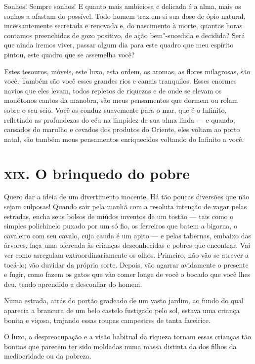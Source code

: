 Sonhos! Sempre sonhos! E quanto mais ambiciosa e delicada é a alma, mais
os sonhos a afastam do possível. Todo homem traz em si sua dose de ópio
natural, incessantemente secretada e renovada e, do nascimento à
morte, quantas horas contamos preenchidas de gozo positivo, de
ação bem"-sucedida e decidida? Será que ainda iremos viver, passar algum dia
para este quadro que meu espírito pintou, este quadro que se assemelha
você?

Estes tesouros, móveis, este luxo, esta ordem, os aromas, as
flores milagrosas, são você. Também são você esses grandes rios e
canais tranquilos. Esses enormes navios que eles levam, todos
repletos de riquezas e de onde se elevam os monótonos cantos da
manobra, são meus pensamentos que dormem ou rolam sobre o seu seio.
Você os conduz suavemente para o mar, que é o Infinito, refletindo as
profundezas do céu na limpidez de sua alma linda --- e quando,
cansados do marulho e cevados dos produtos do Oriente, eles voltam ao
porto natal, são também meus pensamentos enriquecidos voltando do
Infinito a você.

\chapter{\textsc{xix.} O brinquedo do pobre}

Quero dar a ideia de um divertimento inocente. Há tão poucas diversões
que não sejam culposas! Quando sair pela manhã com a resoluta
intenção de vagar pelas estradas, encha seus bolsos de miúdos
inventos de um tostão --- tais como o simples polichinelo puxado por um
só fio, os ferreiros que batem a bigorna, o cavaleiro com seu cavalo,
cuja cauda é um apito --- e pelas tabernas, embaixo das
árvores, faça uma oferenda às crianças desconhecidas e pobres que
encontrar. Vai ver como arregalam extraordinariamente os olhos.
Primeiro, não vão se atrever a tocá-lo; vão duvidar da própria sorte. Depois, vão agarrar avidamente o presente e fugir, como fazem os
gatos que vão comer longe de você o bocado que você lhes
deu, tendo aprendido a desconfiar do homem.

Numa estrada, atrás do portão gradeado de um vasto jardim, ao fundo do qual aparecia
a brancura de um belo castelo fustigado pelo sol, estava uma
criança bonita e viçosa, trajando essas roupas campestres de tanta
faceirice.

O luxo, a despreocupação e a visão habitual da riqueza tornam essas
crianças tão bonitas que parecem ter sido moldadas numa massa distinta da
dos filhos da mediocridade ou da pobreza.

